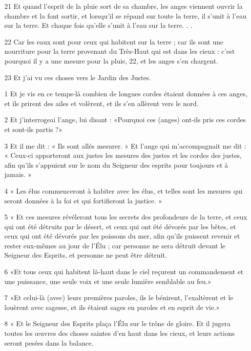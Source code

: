 \par 21 Et quand l'esprit de la pluie sort de sa chambre, les anges viennent ouvrir la chambre et la font sortir, et lorsqu'il se répand sur toute la terre, il s'unit à l'eau sur la terre. Et chaque fois qu'elle s'unit à l'eau sur la terre. . .
\par 22 Car les eaux sont pour ceux qui habitent sur la terre ; car ils sont une nourriture pour la terre provenant du Très-Haut qui est dans les cieux : c'est pourquoi il y a une mesure pour la pluie, 22, et les anges s'en chargent.
\par 23 Et j'ai vu ces choses vers le Jardin des Justes.


\par 1 Et je vis en ce temps-là combien de longues cordes étaient données à ces anges, et ils prirent des ailes et volèrent, et ils s'en allèrent vers le nord.
\par 2 Et j'interrogeai l'ange, lui disant : «Pourquoi ces (anges) ont-ils pris ces cordes et sont-ils partis ?»
\par 3 Et il me dit : « Ils sont allés mesurer. » Et l’ange qui m’accompagnait me dit : « Ceux-ci apporteront aux justes les mesures des justes et les cordes des justes, afin qu’ils s’appuient sur le nom du Seigneur des esprits pour toujours et à jamais. »
\par 4 « Les élus commenceront à habiter avec les élus, et telles sont les mesures qui seront données à la foi et qui fortifieront la justice. »
\par 5 « Et ces mesures révéleront tous les secrets des profondeurs de la terre, et ceux qui ont été détruits par le désert, et ceux qui ont été dévorés par les bêtes, et ceux qui ont été dévorés par les poissons du mer, afin qu'ils puissent revenir et rester eux-mêmes au jour de l'Élu ; car personne ne sera détruit devant le Seigneur des Esprits, et personne ne peut être détruit.
\par 6 «Et tous ceux qui habitent là-haut dans le ciel reçurent un commandement et une puissance, une seule voix et une seule lumière semblable au feu.»
\par 7 «Et celui-là (avec) leurs premières paroles, ils le bénirent, l'exaltèrent et le louèrent avec sagesse, et ils étaient sages en paroles et en esprit de vie.»
\par 8 « Et le Seigneur des Esprits plaça l'Élu sur le trône de gloire. Et il jugera toutes les œuvres des choses saintes d’en haut dans les cieux, et leurs actions seront pesées dans la balance.
